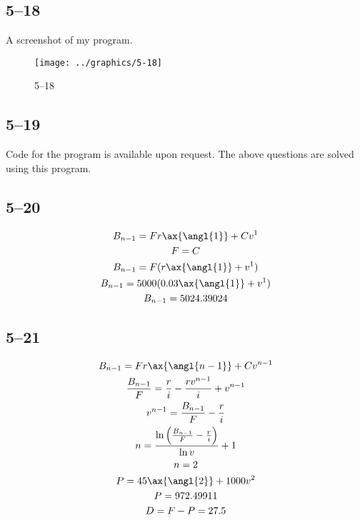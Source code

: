 \documentclass[a4paper, 12pt, reqno]{amsart}
\begin{document}
\subsection*{5--18}

A screenshot of my program.
\begin{figure}[H]
    \texttt{[image: ../graphics/5-18]}
    \caption{5--18}
\end{figure}

\subsection*{5--19}

Code for the program is available upon request. The above questions are solved
using this program.

\subsection*{5--20}

\begin{equation}\nonumber
    \begin{gathered}
        B_{n-1} = Fr \ax{\angl{1}} + C v^1  \\
        F = C       \\
        B_{n-1} = F(r \ax{\angl{1}} + v^1)  \\
        B_{n-1} = 5000(0.03 \ax{\angl{1}} + v^1)  \\
        B_{n-1} = 5024.39024
    \end{gathered}
\end{equation}

\subsection*{5--21}

\begin{equation}\nonumber
    \begin{gathered}
        B_{n-1} = Fr \ax{\angl{n-1}} + C v^{n-1}  \\
        \frac{B_{n-1}}{F} = \frac{r}{i} - \frac{rv^{n-1}}{i} + v^{n-1}      \\
        v^{n-1} = \frac{B_{n-1}}{F} - \frac{r}{i}       \\
        n = \frac{\ln \left( \frac{B_{n-1}}{F} - \frac{r}{i} \right)}{\ln v}+1\\
        n = 2                               \\
        P = 45 \ax{\angl{2}} + 1000 v^2     \\
        P = 972.49911                       \\
        D = F - P = 27.5                    \\
    \end{gathered}
\end{equation}
\end{document}
